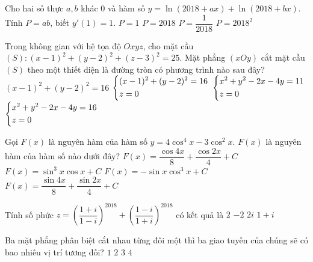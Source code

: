 \begin{ex}%
Cho hai số thực $a,b$ khác $0$ và hàm số $y=\ln (2018+ax) + \ln (2018 +bx)$. Tính $P=ab$, biết $y'(1)=1.$
\choice
{$P=1$}
{$P=2018$}
{$P=\dfrac{1}{2018}$}
{\True $P=2018^2$}
\end{ex}

\begin{ex}%
Trong không gian với hệ tọa độ $Oxyz$, cho mặt cầu $(S):(x-1)^2+(y-2)^2+(z-3)^2=25$. Mặt phẳng $(xOy)$ cắt mặt cầu $(S)$ theo một thiết diện là đường tròn có phương trình nào sau đây?
\choice
{$(x-1)^2+(y-2)^2=16$}
{\True $\left\{\begin{aligned}&(x-1)^2+(y-2)^2=16\\&z=0\end{aligned}\right.$}
{$\left\{\begin{aligned}&x^2+y^2-2x-4y=11\\&z=0\end{aligned}\right.$}
{$\left\{\begin{aligned}&x^2+y^2-2x-4y=16\\&z=0\end{aligned}\right.$}
\end{ex}

\begin{ex}%
Gọi $F(x)$ là nguyên hàm của hàm số $y=4\cos^4x -3\cos^2 x$. $F(x)$ là nguyên hàm của hàm số nào dưới đây?
\choice
{$F(x)=\dfrac{\cos 4x}{8}+\dfrac{\cos 2x}{4}+C$}
{$F(x) =\sin^3 x \cos x +C$}
{$F(x) =-\sin x \cos^3 x +C$}
{\True $F(x)=\dfrac{\sin 4x}{8}+\dfrac{\sin 2x}{4}+C$}
\end{ex}


\begin{ex}%
Tính số phức $z=\left (\dfrac{1+i}{1-i}\right )^{2018} + \left (\dfrac{1-i}{1+i}\right )^{2018}$ có kết quả là 
\choice
{$2$}
{\True $-2$}
{$2i$}
{$1+i$}
\end{ex}

\begin{ex}%
Ba mặt phẳng phân biệt cắt nhau từng đôi một thì ba giao tuyến của chúng sẽ có bao nhiêu vị trí tương đối?
\choice
{$1$}
{\True $2$}
{$3$}
{$4$}
\end{ex}



